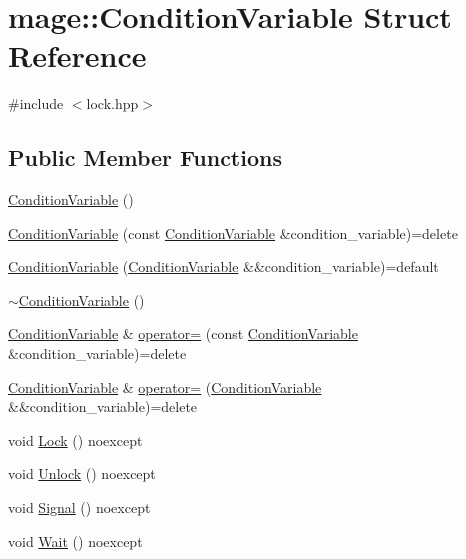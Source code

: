 \hypertarget{structmage_1_1_condition_variable}{}\section{mage\+:\+:Condition\+Variable Struct Reference}
\label{structmage_1_1_condition_variable}


{\ttfamily \#include $<$lock.\+hpp$>$}

\subsection*{Public Member Functions}
\begin{DoxyCompactItemize}
\item 
\hyperlink{structmage_1_1_condition_variable_a09073f0affc601f052fce541a17ba559}{Condition\+Variable} ()
\item 
\hyperlink{structmage_1_1_condition_variable_add5ccf5807a94588c28621141df334d3}{Condition\+Variable} (const \hyperlink{structmage_1_1_condition_variable}{Condition\+Variable} \&condition\+\_\+variable)=delete
\item 
\hyperlink{structmage_1_1_condition_variable_a16507f71180938eb82af7e35d3ca5df7}{Condition\+Variable} (\hyperlink{structmage_1_1_condition_variable}{Condition\+Variable} \&\&condition\+\_\+variable)=default
\item 
\hyperlink{structmage_1_1_condition_variable_accd5253beb65b2904428afdb889cf00b}{$\sim$\+Condition\+Variable} ()
\item 
\hyperlink{structmage_1_1_condition_variable}{Condition\+Variable} \& \hyperlink{structmage_1_1_condition_variable_ac83eae5353cd004ee06fe2376e5bdbf4}{operator=} (const \hyperlink{structmage_1_1_condition_variable}{Condition\+Variable} \&condition\+\_\+variable)=delete
\item 
\hyperlink{structmage_1_1_condition_variable}{Condition\+Variable} \& \hyperlink{structmage_1_1_condition_variable_a3f05c5b53b2530e9fdd1bb890aa375c4}{operator=} (\hyperlink{structmage_1_1_condition_variable}{Condition\+Variable} \&\&condition\+\_\+variable)=delete
\item 
void \hyperlink{structmage_1_1_condition_variable_aab712c41e76c444606d5419a20d87b7a}{Lock} () noexcept
\item 
void \hyperlink{structmage_1_1_condition_variable_a40e853cf65b0c3cb3788d2b8a45448af}{Unlock} () noexcept
\item 
void \hyperlink{structmage_1_1_condition_variable_ad48673a4f7ea2a28c7ddc77222e5d8cc}{Signal} () noexcept
\item 
void \hyperlink{structmage_1_1_condition_variable_a15a1d797032d178c787a385d11522efb}{Wait} () noexcept
\end{DoxyCompactItemize}
